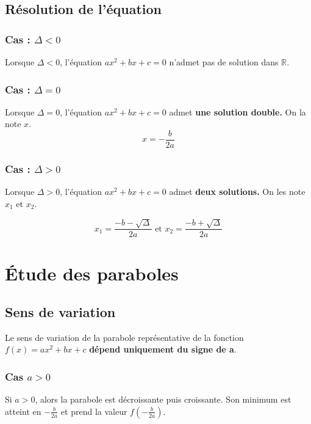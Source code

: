 \documentclass[paper=a4, fontsize=9pt]{scrartcl} %
\begin{document}
\subsection{Résolution de l'équation}

\subsubsection{Cas : $\Delta < 0$}

Lorsque $\Delta < 0$, l'équation $a x^2 + b x + c = 0$ n'admet pas de solution dans $\mathbb{R}$.

\subsubsection{Cas : $\Delta = 0$}

Lorsque $\Delta = 0$, l'équation $a x^2 + b x + c = 0$ admet \textbf{une solution double.} On la note $x$.
$$x = -\dfrac{b}{2a}$$


\subsubsection{Cas : $\Delta > 0$}

Lorsque $\Delta > 0$, l'équation $a x^2 + b x + c = 0$ admet \textbf{deux solutions.} On les note $x_1$ et $x_2$.

$$x_1 = \dfrac{-b - \sqrt{\Delta}}{2a} \text{ et } x_2 = \dfrac{-b + \sqrt{\Delta}}{2a}$$
\newpage
\section{Étude des paraboles}

\subsection{Sens de variation}

Le sens de variation de la parabole représentative de la fonction $f(x) = ax^2 + bx + c$ \textbf{dépend uniquement du signe de a}.

\subsubsection{Cas $a > 0$}
Si $a > 0$, alors la parabole est décroissante puis croissante. Son minimum est atteint  en $-\frac{b}{2a}$ et prend la valeur $f( -\frac{b}{2a} ) $.
\end{document}
